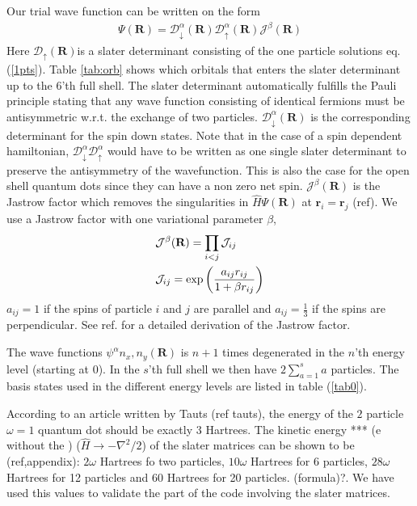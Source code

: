 \documentclass[a4paper,10pt,twocolumn]{article} %
\newcommand{\ts}[1]{\textbf{#1}}
\begin{document}
Our trial wave function can be written on the form
\begin{align}
	\Psi(\ts R) = \mathcal D_\downarrow^{\alpha}(\ts R) \mathcal D_\uparrow^\alpha(\ts R) \mathcal J^\beta(\ts R) 
\end{align}
Here $\mathcal D_\uparrow(\ts R)$is a slater determinant consisting of the one particle solutions eq. (\ref{1pts}). Table \ref{tab:orb} shows which orbitals that
enters the slater determinant up to the $6$'th full shell.
The slater determinant automatically fulfills the Pauli principle stating that any wave function consisting of identical fermions must be 
antisymmetric w.r.t. the exchange of two particles.
$\mathcal D_\downarrow^\alpha(\ts R)$ is the corresponding determinant for the spin down states. Note that in the case of a spin dependent hamiltonian,
$\mathcal D^\alpha_\downarrow \mathcal D^\alpha_\uparrow$ would have to be written as one single slater determinant to preserve the antisymmetry of the wavefunction.
This is also the case for the open shell quantum dots since they can have a non zero net spin.
$\mathcal J^\beta(\ts R)$ is the Jastrow factor which removes the singularities in $\hat H \Psi(\ts R)$ at $\ts r_i = \ts r_j$ (ref).
We use a Jastrow factor with one variational parameter $\beta$,
\begin{align}
	&\mathcal J^\beta(\ts R) = \prod_{i<j} \mathcal J_{ij}\notag\\
	&\mathcal J_{ij} = \exp\left( \frac {a_{ij}r_{ij}}{1+\beta r_{ij}} \right)
\end{align}
$a_{ij}=1$ if the spins of particle $i$ and $j$ are parallel and $a_{ij}=\frac13$ if the spins are perpendicular.
See ref. \cite{lars_eivind_thesis} for a detailed derivation of the Jastrow factor.

The wave functions $\psi^\alpha{n_x,n_y}(\ts R)$ is $n+1$ times degenerated in the $n$'th energy level (starting at $0$). 
In the $s$'th full shell we then have $2\sum_{a=1}^s a$ particles. The basis states used in the different energy levels are listed in table (\ref{tab0}).

According to an article written by Tauts (ref tauts), the energy of the $2$ particle $\omega=1$ quantum dot should be exactly $3$ Hartrees.
The kinetic energy *** (e without the ) ($\hat H\to -\nabla^2/2$) of the slater matrices can be shown to be (ref,appendix): $2\omega$ Hartrees fo two particles, $10\omega$ 
Hartrees for 6 particles, $28\omega$ Hartrees for 12 particles and $60$ Hartrees for 20 particles. (formula)?. We have used this values to validate the part of the code involving
the slater matrices. 
\end{document}
